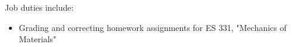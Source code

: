 \normalsize
Job duties include:
\small
\begin{itemize}
    \item Grading and correcting homework assignments for ES 331, "Mechanics of Materials"
\end{itemize}\normalsize
\medskip

